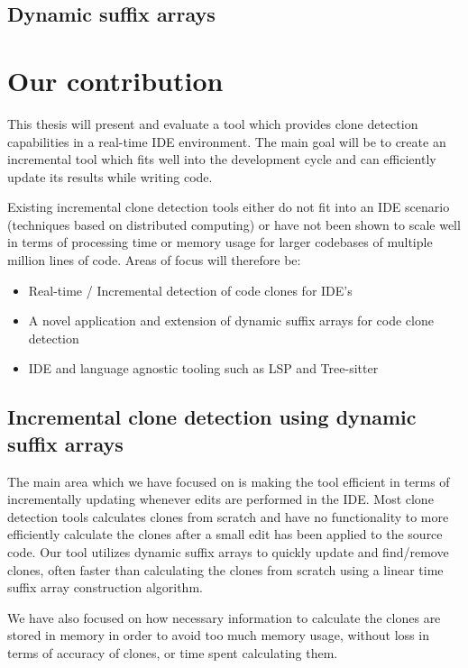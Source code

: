 \subsection{Dynamic suffix arrays}

\section{Our contribution}

This thesis will present and evaluate a tool which provides clone detection capabilities
in a real-time IDE environment. The main goal will be to create an incremental tool which
fits well into the development cycle and can efficiently update its results while writing
code. 
    
Existing incremental clone detection tools either do not fit into an IDE scenario
(techniques based on distributed computing) or have not been shown to scale well in terms
of processing time or memory usage for larger codebases of multiple million lines of code.
Areas of focus will therefore be:

\begin{itemize}
	\item Real-time / Incremental detection of code clones for IDE's 
    \item A novel application and extension of dynamic suffix arrays for code clone detection
	\item IDE and language agnostic tooling such as LSP and Tree-sitter
\end{itemize}


\subsection{Incremental clone detection using dynamic suffix arrays}

The main area which we have focused on is making the tool efficient in terms of
incrementally updating whenever edits are performed in the IDE. Most clone detection
tools calculates clones from scratch and have no functionality to more efficiently
calculate the clones after a small edit has been applied to the source code. Our tool
utilizes dynamic suffix arrays to quickly update and find/remove clones, often faster than
calculating the clones from scratch using a linear time suffix array construction
algorithm.

We have also focused on how necessary information to calculate the clones are stored in
memory in order to avoid too much memory usage, without loss in terms of accuracy of
clones, or time spent calculating them.

